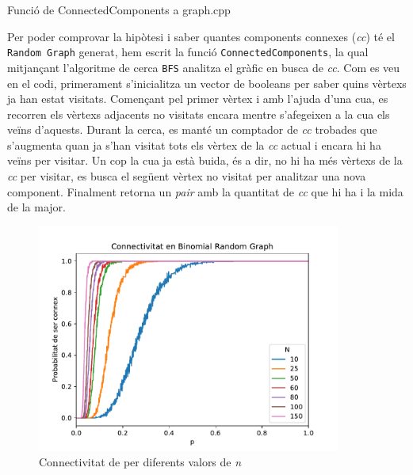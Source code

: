 \begin{listing}
\inputminted[firstline=83,lastline=122]{cpp}{src/graph.cpp}
\caption{Funció de ConnectedComponents a graph.cpp}
\label{listing:conComp}
\end{listing}

Per poder comprovar la hipòtesi i saber quantes components connexes (\textit{cc}) té el \texttt{Random Graph} generat, hem escrit la funció \texttt{ConnectedComponents}, la qual mitjançant l'algoritme de cerca \texttt{BFS} analitza el gràfic en busca de \textit{cc}. Com es veu en el codi, primerament s'inicialitza un vector de booleans per saber quins vèrtexs ja han estat visitats. Començant pel primer vèrtex i amb l'ajuda d'una cua, es recorren els vèrtexs adjacents no visitats encara mentre s'afegeixen a la cua els veïns d'aquests. Durant la cerca, es manté un comptador de \textit{cc} trobades que s'augmenta quan ja s'han visitat tots els vèrtex de la \textit{cc} actual i encara hi ha veïns per visitar. Un cop la cua ja està buida, és a dir, no hi ha més vèrtexs de la \textit{cc} per visitar, es busca el següent vèrtex no visitat per analitzar una nova component. Finalment retorna un \textit{pair} amb la quantitat de \textit{cc} que hi ha i la mida de la major.



\begin{figure}[H]
    \centering
    \includegraphics[width=10cm]{plots/BRG_esConnex.pdf}
    \caption{Connectivitat de \BRG per diferents valors de \textit{n}}
    \label{fig:connect_BRG}
\end{figure}

